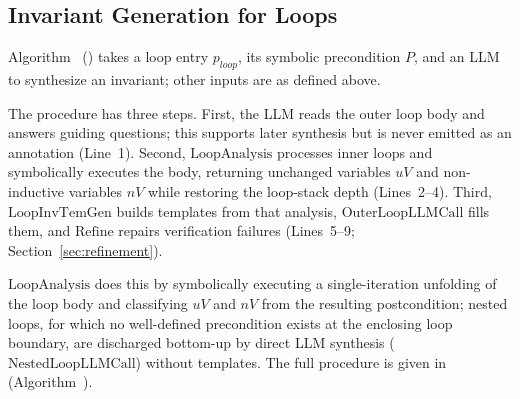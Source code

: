 
\subsection{Invariant Generation for Loops}
Algorithm~ () takes a loop entry $p_{\textit{loop}}$, its symbolic precondition $P$, and an LLM to synthesize an invariant; other inputs are as defined above.

The procedure has three steps. First, the LLM reads the outer loop body and answers guiding questions; this supports later synthesis but is never emitted as an annotation (Line~1). Second, $\mathrm{LoopAnalysis}$ processes inner loops and symbolically executes the body, returning unchanged variables $\textit{uV}$ and non-inductive variables $\textit{nV}$ while restoring the loop-stack depth (Lines~2--4). Third, $\mathrm{LoopInvTemGen}$ builds templates from that analysis, $\mathrm{OuterLoopLLMCall}$ fills them, and $\mathrm{Refine}$ repairs verification failures (Lines~5--9; Section~\ref{sec:refinement}).

{$\mathrm{LoopAnalysis}$ does this by symbolically executing a
single-iteration unfolding of the loop body and classifying $\textit{uV}$ and
$\textit{nV}$ from the resulting postcondition; nested loops, for which no
well-defined precondition exists at the enclosing loop boundary, are discharged
bottom-up by direct LLM synthesis ($\mathrm{NestedLoopLLMCall}$) without
templates. The full procedure is given in  (Algorithm~).}
